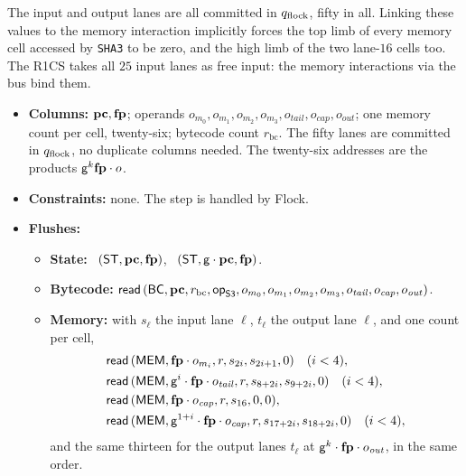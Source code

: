 The input and output lanes are all committed in $q_{\mathrm{flock}}$, fifty in all. Linking these values to the memory interaction implicitly forces the top limb of every memory cell accessed by \texttt{SHA3} to be zero, and the high limb of the two lane-$16$ cells too. The R1CS takes all $25$ input lanes as free input: the memory interactions via the bus bind them.
\begin{itemize}
\item \textbf{Columns:} $\mathbf{pc},\mathbf{fp}$; operands $o_{m_0},o_{m_1},o_{m_2},o_{m_3},o_{\mathit{tail}},o_{\mathit{cap}},o_{\mathit{out}}$; one memory count per cell, twenty-six; bytecode count $r_{\mathrm{bc}}$. The fifty lanes are committed in $q_{\mathrm{flock}}$, no duplicate columns needed. The twenty-six addresses are the products $\mathsf{g}^{k}\mathbf{fp}\cdot o$.
\item \textbf{Constraints:} none. The step is handled by Flock.
\item \textbf{Flushes:}
  \begin{itemize}
  \item \textbf{State:} \pull\ $( \mathsf{ST},\mathbf{pc},\mathbf{fp} )$, \push\ $( \mathsf{ST},\mathsf{g}\cdot\mathbf{pc},\mathbf{fp} )$.
  \item \textbf{Bytecode:} $\mathsf{read}\,( \mathsf{BC},\mathbf{pc},r_{\mathrm{bc}},\mathsf{op}_{\mathsf{S3}},o_{m_0},o_{m_1},o_{m_2},o_{m_3},o_{\mathit{tail}},o_{\mathit{cap}},o_{\mathit{out}} )$.
  \item \textbf{Memory:} with $s_\ell$ the input lane $\ell$, $t_\ell$ the output lane $\ell$, and one count per cell,
    \begin{align*}
      &\mathsf{read}\,( \mathsf{MEM},\mathbf{fp}\cdot o_{m_i},r,s_{2i},s_{2i+1},0 )\quad(i<4),\\
      &\mathsf{read}\,( \mathsf{MEM},\mathsf{g}^{i}\cdot\mathbf{fp}\cdot o_{\mathit{tail}},r,s_{8+2i},s_{9+2i},0 )\quad(i<4),\\
      &\mathsf{read}\,( \mathsf{MEM},\mathbf{fp}\cdot o_{\mathit{cap}},r,s_{16},0,0 ),\\
      &\mathsf{read}\,( \mathsf{MEM},\mathsf{g}^{1+i}\cdot\mathbf{fp}\cdot o_{\mathit{cap}},r,s_{17+2i},s_{18+2i},0 )\quad(i<4),
    \end{align*}
    and the same thirteen for the output lanes $t_\ell$ at $\mathsf{g}^{k}\cdot\mathbf{fp}\cdot o_{\mathit{out}}$, in the same order.
  \end{itemize}
\end{itemize}
